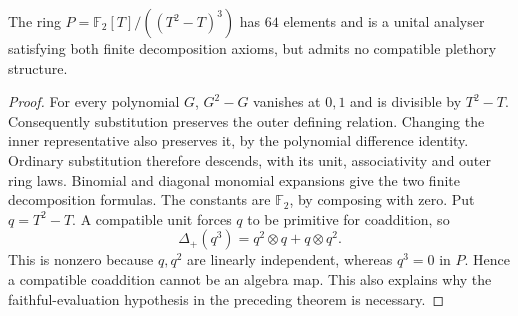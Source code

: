 \begin{example}\label{ex:finite-analyser-without-biring}
The ring $P=\mathbb F_2[T]/((T^2-T)^3)$ has $64$ elements and
is a unital analyser satisfying both finite decomposition axioms,
but admits no compatible plethory structure.
\end{example}
\begin{proof}
For every polynomial $G$, $G^2-G$ vanishes at $0,1$ and is
divisible by $T^2-T$. Consequently substitution preserves the
outer defining relation. Changing the inner representative also
preserves it, by the polynomial difference identity. Ordinary
substitution therefore descends, with its unit, associativity and
outer ring laws. Binomial and diagonal monomial expansions give
the two finite decomposition formulas. The constants are
$\mathbb F_2$, by composing with zero.
Put $q=T^2-T$. A compatible unit forces $q$ to be primitive for
coaddition, so
\[
                  \Delta_+(q^3)=q^2\otimes q+q\otimes q^2.
\]
This is nonzero because $q,q^2$ are linearly independent, whereas
$q^3=0$ in $P$. Hence a compatible coaddition cannot be an algebra
map. This also explains why the faithful-evaluation hypothesis
in the preceding theorem is necessary.
\end{proof}
